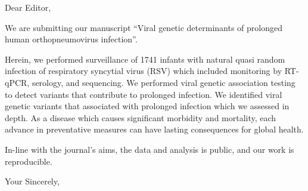 \documentclass[13.5pt, a4paper]{letter}
\begin{document}
 
\begin{letter}{} 
\opening{}


Dear Editor,

We are submitting our manuscript 
``Viral genetic determinants of prolonged human orthopneumovirus infection''. 

Herein, we performed surveillance of 1741 infants with
natural quasi random infection of respiratory syncytial virus (RSV) which included monitoring by RT-qPCR, serology, and sequencing.
We performed viral genetic association testing to detect variants that contribute to prolonged infection.
We identified viral genetic variants that associated with prolonged infection which we assessed in depth.
As a disease which causes significant morbidity and mortality, each advance in preventative measures can have lasting consequences for global health.

In-line with the journal's aims, the data and analysis is public, and our work is reproducible.

\closing{Your Sincerely,
}
\end{letter} 
\end{document}
